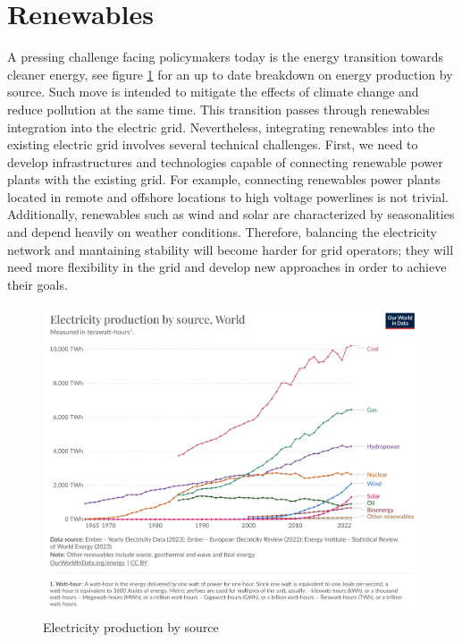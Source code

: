 \section{Renewables}
A pressing challenge facing policymakers today is the energy transition towards cleaner energy, see figure \ref{fig:electricity_production_by_source} for an up to date breakdown on energy production by source. Such move is intended to mitigate the effects of climate change and reduce pollution at the same time.
This transition passes through renewables integration into the electric grid. 
Nevertheless, integrating renewables into the existing electric grid involves several technical challenges. First, we need to develop infrastructures and technologies capable of connecting renewable power plants with the existing grid. For example, connecting renewables power plants located in remote and offshore locations to high voltage powerlines is not trivial.
Additionally, renewables such as wind and solar are characterized by seasonalities and depend heavily on weather conditions. Therefore, balancing the electricity network and mantaining stability will become harder for grid operators; they will need more flexibility in the grid and develop new approaches in order to achieve their goals.

\begin{figure}[!h]
    \includegraphics[width=\textwidth]{images/electricity-production-by-source.png}
    \caption{Electricity production by source}    
    \label{fig:electricity_production_by_source}
\end{figure}

